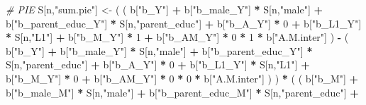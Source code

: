 \documentclass[
]{book}
\newenvironment{Shaded}{\begin{snugshade}}{\end{snugshade}}
\newcommand{\CommentTok}[1]{\textcolor[rgb]{0.56,0.35,0.01}{\textit{#1}}}
\newcommand{\DecValTok}[1]{\textcolor[rgb]{0.00,0.00,0.81}{#1}}
\newcommand{\NormalTok}[1]{#1}
\newcommand{\OtherTok}[1]{\textcolor[rgb]{0.56,0.35,0.01}{#1}}
\newcommand{\SpecialCharTok}[1]{\textcolor[rgb]{0.81,0.36,0.00}{\textbf{#1}}}
\newcommand{\StringTok}[1]{\textcolor[rgb]{0.31,0.60,0.02}{#1}}
\begin{document}
\begin{Shaded}
\begin{Highlighting}[]
    \CommentTok{\# PIE }
\NormalTok{    S[n,}\StringTok{"sum.pie"}\NormalTok{] }\OtherTok{\textless{}{-}}\NormalTok{ ( ( b[}\StringTok{"b\_Y"}\NormalTok{] }\SpecialCharTok{+} 
\NormalTok{                            b[}\StringTok{"b\_male\_Y"}\NormalTok{] }\SpecialCharTok{*}\NormalTok{ S[n,}\StringTok{"male"}\NormalTok{] }\SpecialCharTok{+} 
\NormalTok{                            b[}\StringTok{"b\_parent\_educ\_Y"}\NormalTok{] }\SpecialCharTok{*}\NormalTok{ S[n,}\StringTok{"parent\_educ"}\NormalTok{] }\SpecialCharTok{+} 
\NormalTok{                            b[}\StringTok{"b\_A\_Y"}\NormalTok{] }\SpecialCharTok{*} \DecValTok{0} \SpecialCharTok{+} 
\NormalTok{                            b[}\StringTok{"b\_L1\_Y"}\NormalTok{] }\SpecialCharTok{*}\NormalTok{ S[n,}\StringTok{"L1"}\NormalTok{] }\SpecialCharTok{+}
\NormalTok{                            b[}\StringTok{"b\_M\_Y"}\NormalTok{] }\SpecialCharTok{*} \DecValTok{1} \SpecialCharTok{+}
\NormalTok{                            b[}\StringTok{"b\_AM\_Y"}\NormalTok{] }\SpecialCharTok{*} \DecValTok{0} \SpecialCharTok{*} \DecValTok{1} \SpecialCharTok{*}\NormalTok{ b[}\StringTok{"A.M.inter"}\NormalTok{] ) }\SpecialCharTok{{-}} 
\NormalTok{                          ( b[}\StringTok{"b\_Y"}\NormalTok{] }\SpecialCharTok{+} 
\NormalTok{                              b[}\StringTok{"b\_male\_Y"}\NormalTok{] }\SpecialCharTok{*}\NormalTok{ S[n,}\StringTok{"male"}\NormalTok{] }\SpecialCharTok{+} 
\NormalTok{                              b[}\StringTok{"b\_parent\_educ\_Y"}\NormalTok{] }\SpecialCharTok{*}\NormalTok{ S[n,}\StringTok{"parent\_educ"}\NormalTok{] }\SpecialCharTok{+} 
\NormalTok{                              b[}\StringTok{"b\_A\_Y"}\NormalTok{] }\SpecialCharTok{*} \DecValTok{0} \SpecialCharTok{+} 
\NormalTok{                              b[}\StringTok{"b\_L1\_Y"}\NormalTok{] }\SpecialCharTok{*}\NormalTok{ S[n,}\StringTok{"L1"}\NormalTok{] }\SpecialCharTok{+}
\NormalTok{                              b[}\StringTok{"b\_M\_Y"}\NormalTok{] }\SpecialCharTok{*} \DecValTok{0} \SpecialCharTok{+}
\NormalTok{                              b[}\StringTok{"b\_AM\_Y"}\NormalTok{] }\SpecialCharTok{*} \DecValTok{0} \SpecialCharTok{*} \DecValTok{0} \SpecialCharTok{*}\NormalTok{ b[}\StringTok{"A.M.inter"}\NormalTok{] ) ) }\SpecialCharTok{*}
\NormalTok{      ( ( b[}\StringTok{"b\_M"}\NormalTok{] }\SpecialCharTok{+} 
\NormalTok{            b[}\StringTok{"b\_male\_M"}\NormalTok{] }\SpecialCharTok{*}\NormalTok{ S[n,}\StringTok{"male"}\NormalTok{] }\SpecialCharTok{+} 
\NormalTok{            b[}\StringTok{"b\_parent\_educ\_M"}\NormalTok{] }\SpecialCharTok{*}\NormalTok{ S[n,}\StringTok{"parent\_educ"}\NormalTok{] }\SpecialCharTok{+} 

\end{Highlighting}
\end{Shaded}
\end{document}

